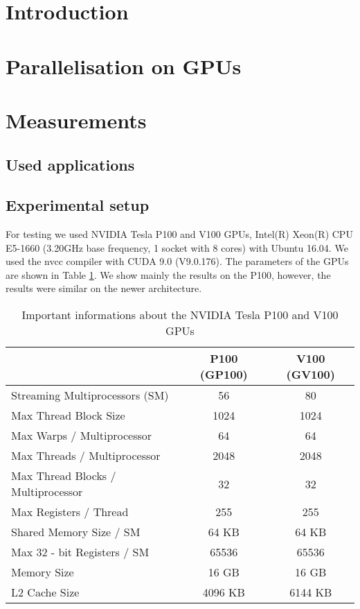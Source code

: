 \section{Introduction}\label{introduction}



\section{Parallelisation on GPUs}\label{parallelisation-on-gpu}



\section{Measurements}\label{measurements}

\subsection{Used applications}\label{used-applications}


\subsection{Experimental setup}\label{experimental-setup}
For testing we used NVIDIA Tesla P100 and V100 GPUs, Intel(R) Xeon(R) CPU
E5-1660 (3.20GHz base frequency, 1 socket with 8 cores) with Ubuntu 16.04. We
used the nvcc compiler with CUDA 9.0 (V9.0.176). The parameters of the GPUs
are shown in Table \ref{tab:GPU_datasheet}. We show mainly the results on the
P100, however, the results were similar on the newer architecture.
\begin{table}
\centering
\begin{tabular}{|l|c|c|}
\hline
  & P100 (GP100) & V100 (GV100)\\ \hline
  Streaming Multiprocessors (SM) 		& 56	& 80\\ \hline
  Max Thread Block Size				& 1024	& 1024 \\ \hline
  Max Warps / Multiprocessor 			& 64 & 64	\\ \hline
  Max Threads / Multiprocessor		& 2048 & 2048	\\ \hline
  Max Thread Blocks / Multiprocessor 	& 32 & 32	\\ \hline
  Max Registers / Thread& 255 & 255	\\ \hline
  Shared Memory Size / SM	& 64 KB & 64 KB	\\ \hline
  Max 32 - bit Registers / SM			& 65536 & 65536\\ \hline
  Memory Size							& 16 GB	& 16 GB\\ \hline
  L2 Cache Size						& 4096 KB & 6144 KB\\ \hline
\end{tabular}
  \caption{Important informations about the NVIDIA Tesla P100 and V100 GPUs
  \cite{Pascal_whitepaper, Volta_whitepaper}}
\label{tab:GPU_datasheet}
\end{table}

